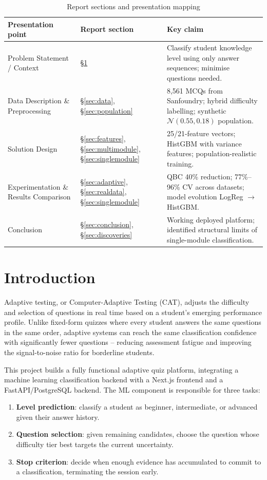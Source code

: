 \documentclass[12pt,a4paper]{article}
\begin{document}
\begin{table}[H]
\centering
\caption{Report sections and presentation mapping}
\begin{tabular}{@{}p{4.5cm}p{4.5cm}p{5cm}@{}}
\toprule
Presentation point & Report section & Key claim \\
\midrule
Problem Statement / Context &
\S\ref{sec:intro} &
Classify student knowledge level using only answer sequences; minimise questions needed. \\[4pt]
Data Description \& Preprocessing &
\S\ref{sec:data}, \S\ref{sec:population} &
8,561 MCQs from Sanfoundry; hybrid difficulty labelling; synthetic $\mathcal{N}(0.55,0.18)$ population. \\[4pt]
Solution Design &
\S\ref{sec:features}, \S\ref{sec:multimodule}, \S\ref{sec:singlemodule} &
25/21-feature vectors; HistGBM with variance features; population-realistic training. \\[4pt]
Experimentation \& Results Comparison &
\S\ref{sec:adaptive}, \S\ref{sec:realdata}, \S\ref{sec:singlemodule} &
QBC 40\% reduction; 77\%--96\% CV across datasets; model evolution LogReg $\to$ HistGBM. \\[4pt]
Conclusion &
\S\ref{sec:conclusion}, \S\ref{sec:discoveries} &
Working deployed platform; identified structural limits of single-module classification. \\
\bottomrule
\end{tabular}
\end{table}

\section{Introduction}
\label{sec:intro}

Adaptive testing, or Computer-Adaptive Testing (CAT), adjusts the difficulty and
selection of questions in real time based on a student's emerging performance profile.
Unlike fixed-form quizzes where every student answers the same questions in the same
order, adaptive systems can reach the same classification confidence with significantly
fewer questions -- reducing assessment fatigue and improving the signal-to-noise ratio
for borderline students.

This project builds a fully functional adaptive quiz platform, integrating a machine
learning classification backend with a Next.js frontend and a FastAPI/PostgreSQL
backend. The ML component is responsible for three tasks:
\begin{enumerate}[noitemsep]
  \item \textbf{Level prediction}: classify a student as beginner, intermediate, or
        advanced given their answer history.
  \item \textbf{Question selection}: given remaining candidates, choose the question
        whose difficulty tier best targets the current uncertainty.
  \item \textbf{Stop criterion}: decide when enough evidence has accumulated to commit
        to a classification, terminating the session early.
\end{enumerate}
\end{document}
